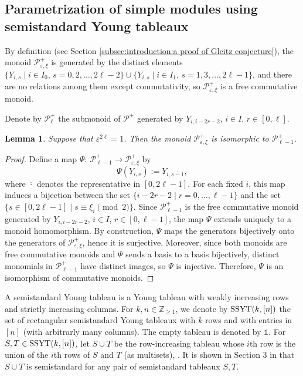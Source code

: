 \documentclass[11pt, reqno]{amsart}
\theoremstyle{plain}
\newtheorem{lemma}[theorem]{Lemma}
\theoremstyle{definition}
\numberwithin{equation}{section}
\newcommand{\ZZ}{{\mathbb {Z}}}
\begin{document}
\subsection{Parametrization of simple modules using semistandard Young tableaux}\label{Sec:the connection between semistandard tableaux and dominant monomials}

By definition (see Section \ref{subsec:introduction:a proof of Gleitz conjecture}), the monoid $\mathcal{P}^+_{\varepsilon,\xi}$ is generated by the distinct elements $\{Y_{i,s} \mid i \in I_0,\, s = 0,2,\dots,2\ell-2\} \cup \{Y_{i,s} \mid i \in I_1,\, s = 1,3,\dots,2\ell-1\}$, 
and there are no relations among them except commutativity, so $\mathcal{P}^+_{\varepsilon,\xi}$ is a free commutative monoid.

Denote by $\mathcal{P}_{\ell}^+$ the submonoid of $\mathcal{P}^+$ generated by $Y_{i,i-2r-2}$, $i \in I$, $r \in [0, \ell]$.  
\begin{lemma} \label{lem:Pepsilon_xi is isomorphic to Pell_minus_one}
Suppose that $\varepsilon^{2\ell}=1$. Then the monoid $\mathcal{P}^+_{\varepsilon, \xi}$ is isomorphic to $\mathcal{P}_{\ell-1}^+$.   
\end{lemma}

\begin{proof}
Define a map $\Psi:\ \mathcal{P}_{\ell-1}^+ \longrightarrow \mathcal{P}^+_{\varepsilon,\xi}$
by
\[
\Psi(Y_{i,s}) := Y_{i, \overline{s-1}},
\]
where $\overline{\cdot}$ denotes the representative in $[0,2\ell-1]$. For each fixed $i$, this map induces a bijection between the set
$\{i-2r-2 \mid r=0,\dots,\ell-1\}$
and the set $\{s \in [0,2\ell-1] \mid s \equiv \xi_i \pmod{2}\}$.
Since $\mathcal{P}_{\ell-1}^+$ is the free commutative monoid generated by $Y_{i,i-2r-2}$, $i \in I$, $r \in [0, \ell-1]$, the map $\Psi$ extends uniquely to a monoid homomorphism. By construction, $\Psi$ maps the generators bijectively onto the generators of $\mathcal{P}^+_{\varepsilon,\xi}$, hence it is surjective. Moreover, since both monoids are free commutative monoids and $\Psi$ sends a basis to a basis bijectively, distinct monomials in $\mathcal{P}_{\ell-1}^+$ have distinct images, so $\Psi$ is injective. Therefore, $\Psi$ is an isomorphism of commutative monoids.
\end{proof}

A semistandard Young tableau is a Young tableau with weakly increasing rows and strictly increasing columns. For $k,n \in \ZZ_{\ge 1}$, we denote by ${\rm SSYT}(k, [n])$ the set of rectangular semistandard Young tableaux with $k$ rows and with entries in $[n]$ (with arbitrarly many columns). The empty tableau is denoted by $\mathds{1}$. For $S,T \in {\rm SSYT}(k, [n])$, let $S \cup T$ be the row-increasing tableau whose $i$th row is the union of the $i$th rows of $S$ and $T$ (as multisets), \cite{CDFL20}. It is shown in Section 3 in \cite{CDFL20} that $S \cup T$ is semistandard for any pair of semistandard tableaux $S, T$.
\end{document}
